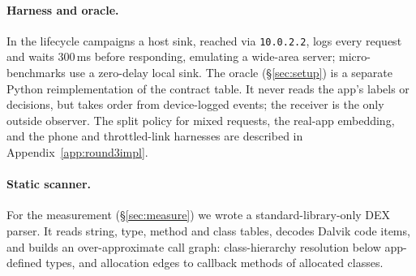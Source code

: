 \paragraph{Harness and oracle.} In the lifecycle campaigns a host sink, reached via \texttt{10.0.2.2}, logs every request and waits 300\,ms before
responding, emulating a wide-area server; micro-benchmarks use a zero-delay local sink. The oracle (\S\ref{sec:setup}) is a separate Python reimplementation of the
contract table. It never reads the app's labels or decisions, but takes order from device-logged events; the receiver is
the only outside observer. The split policy for mixed requests, the real-app embedding,
and the phone and throttled-link harnesses are described in Appendix~\ref{app:round3impl}.

\paragraph{Static scanner.} For the measurement (\S\ref{sec:measure}) we wrote a standard-library-only DEX parser. It
reads string, type, method and class tables, decodes Dalvik code items, and builds an over-approximate call graph:
class-hierarchy resolution below app-defined types, and allocation edges to callback methods of allocated classes.
